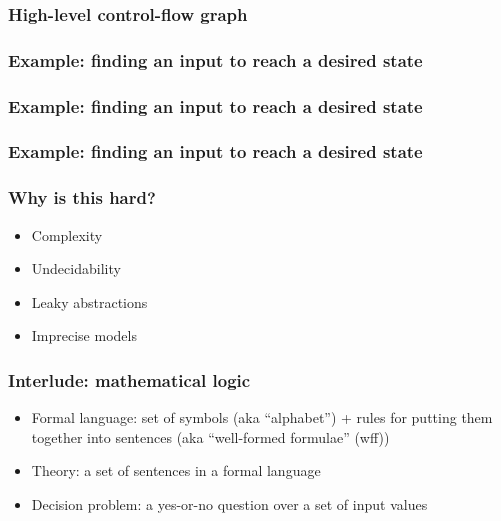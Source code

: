 \documentclass[11pt,table]{beamer}
\begin{document}
  \begin{frame}
    \frametitle{High-level control-flow graph}
    \vspace{-.65cm}\centering
  \end{frame}
  
  
  
\begin{frame}
\frametitle{Example: finding an input to reach a desired state}
  \vspace{-.65cm}\centering
\end{frame}

\begin{frame}
\frametitle{Example: finding an input to reach a desired state}
  \vspace{-.65cm}\centering
\end{frame}

\begin{frame}
\frametitle{Example: finding an input to reach a desired state}
  \vspace{-.65cm}\centering
\end{frame}


\begin{frame}
\frametitle{Why is this hard?}
\begin{itemize}
\item{Complexity}
  \medskip
\item{Undecidability}
  \medskip
\item{Leaky abstractions}
  \medskip
\item{Imprecise models}
\end{itemize}
\end{frame}
  
  
\begin{frame}
  \frametitle{Interlude: mathematical logic}
  \begin{itemize}
  \item{Formal language: set of symbols (aka ``alphabet'') + rules for putting them together into sentences (aka ``well-formed formulae'' (wff))}
    \medskip
  \item{Theory: a set of sentences in a formal language}
    \medskip
  \item{Decision problem: a yes-or-no question over a set of input values}
\end{itemize}
\end{frame}
\end{document}

